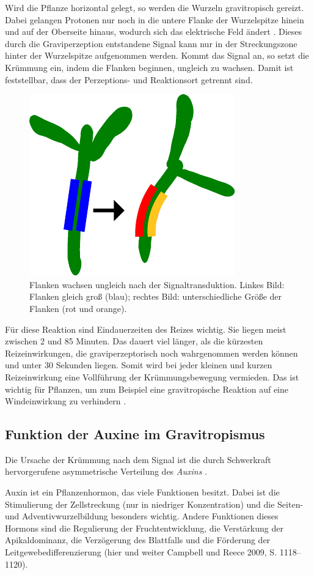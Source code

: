 \documentclass[
11pt, 
ngerman,
listof=totocnumbered,
oneside,
bibliography=totocnumbered,
abstracton
]{scrreprt}
\begin{document}
Wird die Pflanze horizontal gelegt, so werden die Wurzeln gravitropisch gereizt. Dabei gelangen Protonen nur noch in die untere Flanke der Wurzelspitze hinein und auf der Oberseite hinaus, wodurch sich das elektrische Feld ändert \parencite[502--503]{Nultsch}. Dieses durch die Graviperzeption entstandene Signal kann nur in der Streckungszone hinter der Wurzelspitze aufgenommen werden. Kommt das Signal an, so setzt die Krümmung ein, indem die Flanken beginnen, ungleich zu wachsen. Damit ist feststellbar, dass der Perzeptions- und Reaktionsort getrennt sind.

\begin{figure}[H]
	\centering 
	\includegraphics[width = 0.4\linewidth]{images/newdiff.pdf}
	\caption{Flanken wachsen ungleich nach der Signaltransduktion. Linkes Bild: Flanken gleich groß (blau); rechtes Bild: unterschiedliche Größe der Flanken (rot und orange).}
\end{figure} 

Für diese Reaktion sind Eindauerzeiten des Reizes wichtig. Sie liegen meist zwischen 2 und 85 Minuten. Das dauert viel länger, als die kürzesten Reizeinwirkungen, die graviperzeptorisch noch wahrgenommen werden können und unter 30 Sekunden liegen. Somit wird bei jeder kleinen und kurzen Reizeinwirkung eine Vollführung der Krümmungsbewegung vermieden. Das ist wichtig für Pflanzen, um zum Beispiel eine gravitropische Reaktion auf eine Windeinwirkung zu verhindern \parencite[531]{Luettge}.

\subsection{Funktion der Auxine im Gravitropismus}

Die Ursache der Krümmung nach dem Signal ist die durch Schwerkraft hervorgerufene asymmetrische Verteilung des \emph{Auxins} \parencite[502--503]{Nultsch}.

Auxin ist ein Pflanzenhormon, das viele Funktionen besitzt. Dabei ist die Stimulierung der Zellstreckung (nur in niedriger Konzentration) und die Seiten- und Adventivwurzelbildung besonders wichtig. Andere Funktionen dieses Hormons sind die Regulierung der Fruchtentwicklung, die Verstärkung der Apikaldominanz, die Verzögerung des Blattfalls und die Förderung der Leitgewebedifferenzierung (hier und weiter Campbell und Reece 2009, S. 1118--1120).
\end{document}

